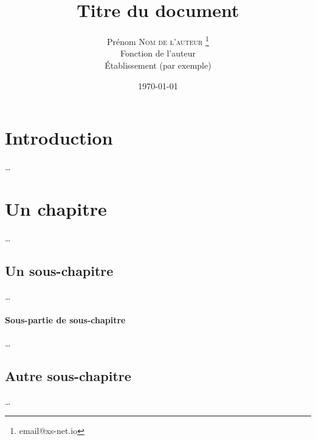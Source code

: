 \documentclass[french, 12pt, twoside, a4paper]{article}
\title{Titre du document}
\author{Prénom \textsc{Nom de l'auteur} \thanks{email@xs-net.io} \\
Fonction de l'auteur \\
Établissement (par exemple)}
\date{\today}
\begin{document}
\maketitle     %


\section*{Introduction}

…

\section{Un chapitre}
…

\subsection{Un sous-chapitre}
…
\paragraph{Sous-partie de sous-chapitre}
…

\subsection{Autre sous-chapitre}
…

%
\end{document}

